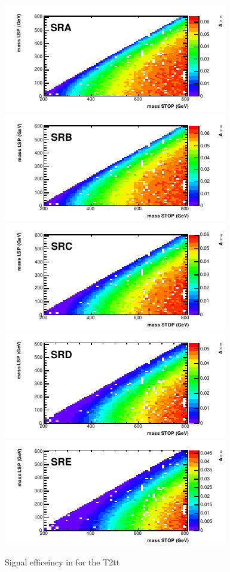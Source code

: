 \begin{figure}[hbt]
  \begin{center}
        \includegraphics[width=0.5\linewidth]{plots/stopPlot/massesA_eff.pdf}%
        \includegraphics[width=0.5\linewidth]{plots/stopPlot/massesB_eff.pdf}
        \includegraphics[width=0.5\linewidth]{plots/stopPlot/massesC_eff.pdf}%
        \includegraphics[width=0.5\linewidth]{plots/stopPlot/massesD_eff.pdf}
        \includegraphics[width=0.5\linewidth]{plots/stopPlot/massesE_eff.pdf}%
    \caption{Signal efficeincy in for the T2tt }
\label{fig:SigEff}
      \end{center}
\end{figure}

